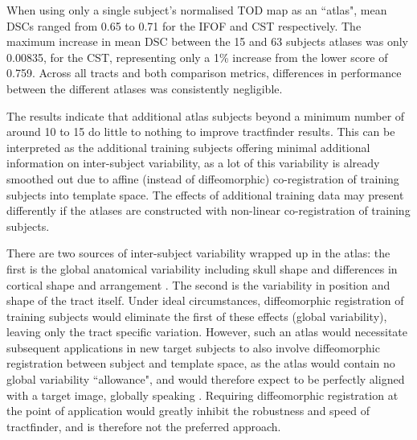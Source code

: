 When using only a single subject's normalised TOD map as an ``atlas", mean DSCs ranged from 0.65 to 0.71 for the IFOF and CST respectively.
The maximum increase in mean DSC between the 15 and 63 subjects atlases was only 0.00835, for the CST, representing only a 1\% increase from the lower score of 0.759.
Across all tracts and both comparison metrics, differences in performance between the different atlases was consistently negligible.

The results indicate that additional atlas subjects beyond a minimum number of around 10 to 15 do little to nothing to improve tractfinder results.
This can be interpreted as the additional training subjects offering minimal additional information on inter-subject variability, as a lot of this variability is already smoothed out due to affine (instead of diffeomorphic) co-registration of training subjects into template space.
The effects of additional training data may present differently if the atlases are constructed with non-linear co-registration of training subjects.

There are two sources of inter-subject variability wrapped up in the atlas: the first is the global anatomical variability including skull shape and differences in cortical shape and arrangement .
The second is the variability in position and shape of the tract itself.
Under ideal circumstances, diffeomorphic registration of training subjects would eliminate the first of these effects (global variability), leaving only the tract specific variation.
However, such an atlas would necessitate subsequent applications in new target subjects to also involve diffeomorphic registration between subject and template space, as the atlas would contain no global variability ``allowance", and would therefore expect to be perfectly aligned with a target image, globally speaking .
Requiring diffeomorphic registration at the point of application would greatly inhibit the robustness and speed of tractfinder, and is therefore not the preferred approach.

